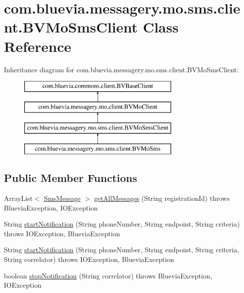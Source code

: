 \hypertarget{classcom_1_1bluevia_1_1messagery_1_1mo_1_1sms_1_1client_1_1BVMoSmsClient}{
\section{com.bluevia.messagery.mo.sms.client.BVMoSmsClient Class Reference}
\label{classcom_1_1bluevia_1_1messagery_1_1mo_1_1sms_1_1client_1_1BVMoSmsClient}
}
Inheritance diagram for com.bluevia.messagery.mo.sms.client.BVMoSmsClient:\begin{figure}[H]
\begin{center}
\leavevmode
\includegraphics[height=4.000000cm]{classcom_1_1bluevia_1_1messagery_1_1mo_1_1sms_1_1client_1_1BVMoSmsClient}
\end{center}
\end{figure}
\subsection*{Public Member Functions}
\begin{DoxyCompactItemize}
\item 
ArrayList$<$ \hyperlink{classcom_1_1bluevia_1_1messagery_1_1mo_1_1sms_1_1data_1_1SmsMessage}{SmsMessage} $>$ \hyperlink{classcom_1_1bluevia_1_1messagery_1_1mo_1_1sms_1_1client_1_1BVMoSmsClient_a444090aec9580c16cd579e7a28a6697e}{getAllMessages} (String registrationId)  throws BlueviaException, IOException 
\item 
String \hyperlink{classcom_1_1bluevia_1_1messagery_1_1mo_1_1sms_1_1client_1_1BVMoSmsClient_a33464277326764368a07008d99555172}{startNotification} (String phoneNumber, String endpoint, String criteria)  throws IOException, BlueviaException
\item 
String \hyperlink{classcom_1_1bluevia_1_1messagery_1_1mo_1_1sms_1_1client_1_1BVMoSmsClient_a008dfb24375cb1609692b9b1831ba265}{startNotification} (String phoneNumber, String endpoint, String criteria, String correlator)  throws IOException, BlueviaException
\item 
boolean \hyperlink{classcom_1_1bluevia_1_1messagery_1_1mo_1_1sms_1_1client_1_1BVMoSmsClient_ad33b9554197b2a4b75d7b0acea8fabb5}{stopNotification} (String correlator)  throws BlueviaException, IOException 
\end{DoxyCompactItemize}
